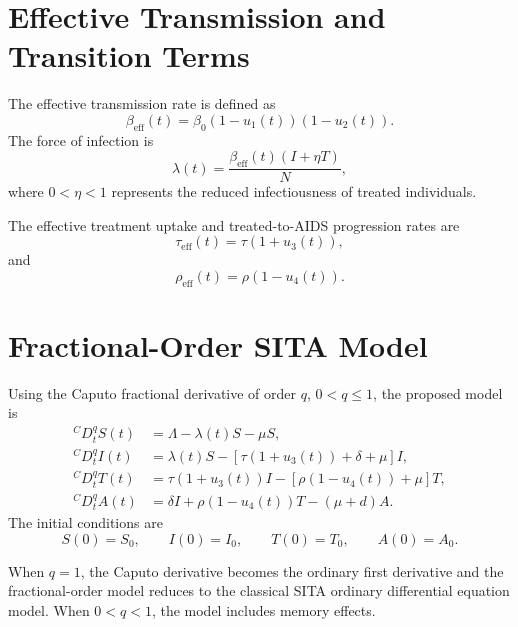\documentclass[12pt,a4paper,oneside]{report}
\newcommand{\CaputoD}[2]{{}^{C}D_{#1}^{#2}}
\newcommand{\beff}{\beta_{\mathrm{eff}}}
\newcommand{\taueff}{\tau_{\mathrm{eff}}}
\newcommand{\rhoeff}{\rho_{\mathrm{eff}}}
\begin{document}
\section{Effective Transmission and Transition Terms}
The effective transmission rate is defined as
\begin{equation}
\beff(t)=\beta_0(1-u_1(t))(1-u_2(t)).
\label{eq:beff_fractional}
\end{equation}
The force of infection is
\begin{equation}
\lambda(t)=\frac{\beff(t)(I+\eta T)}{N},
\label{eq:lambda_fractional}
\end{equation}
where $0<\eta<1$ represents the reduced infectiousness of treated individuals.

The effective treatment uptake and treated-to-AIDS progression rates are
\begin{equation}
\taueff(t)=\tau(1+u_3(t)),
\end{equation}
and
\begin{equation}
\rhoeff(t)=\rho(1-u_4(t)).
\end{equation}

\section{Fractional-Order SITA Model}
Using the Caputo fractional derivative of order $q$, $0<q\leq1$, the proposed model is
\begin{align}
\CaputoD{t}{q}S(t) &= \Lambda-\lambda(t)S-\mu S, \label{eq:fractional_S}\\[4pt]
\CaputoD{t}{q}I(t) &= \lambda(t)S-[\tau(1+u_3(t))+\delta+\mu]I, \label{eq:fractional_I}\\[4pt]
\CaputoD{t}{q}T(t) &= \tau(1+u_3(t))I-[\rho(1-u_4(t))+\mu]T, \label{eq:fractional_T}\\[4pt]
\CaputoD{t}{q}A(t) &= \delta I+\rho(1-u_4(t))T-(\mu+d)A. \label{eq:fractional_A}
\end{align}
The initial conditions are
\begin{equation}
S(0)=S_0,\qquad I(0)=I_0,\qquad T(0)=T_0,\qquad A(0)=A_0.
\end{equation}

\begin{remarkbox}[title={Connection with the Ordinary Model}]
When $q=1$, the Caputo derivative becomes the ordinary first derivative and the fractional-order model reduces to the classical SITA ordinary differential equation model. When $0<q<1$, the model includes memory effects.
\end{remarkbox}
\end{document}
